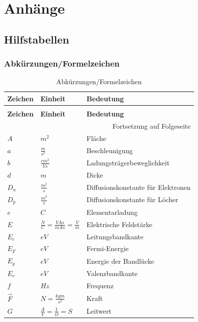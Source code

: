 \documentclass[12pt,a4paper]{report}%
\numberwithin{equation}{section}
\numberwithin{equation}{subsection}
\begin{document}
\chapter{Anhänge}
\section{Hilfstabellen}
	\subsection{Abkürzungen/Formelzeichen} \label{ch:names}
	\renewcommand{\arraystretch}{1.5}
	\begin{longtable} {|p{2cm}|p{3cm}|p{8.4cm}|} \hline
	\textbf{Zeichen} & \textbf{Einheit} & \textbf{Bedeutung} \\
	\hline
	\endfirsthead %
	\caption{Abkürzungen/Formelzeichen}\\ \hline
	\textbf{Zeichen} & \textbf{Einheit} & \textbf{Bedeutung} \\
	\hline
	\endhead %
	\multicolumn{3}{r}{Fortsetzung auf Folgeseite}\\
	\endfoot
	\hline
	\endlastfoot
	
	$A$ & $m^2$ & Fläche \\ \hline
	$a$ & $\frac{m}{s^2}$ & Beschleunigung \\ \hline
	$b$ & $\frac{cm^2}{Vs}$ & Ladungsträgerbeweglichkeit \\ \hline
	$d$ & $m$ & Dicke \\ \hline
	$D_n$ & $\frac{m^2}{s}$ & Diffusionskonstante für Elektronen \\ \hline
	$D_p$ & $\frac{m^2}{s}$ & Diffusionskonstante für Löcher \\ \hline
	$e$ & $C$ & Elementarladung \\ \hline
	$E$ & $\frac{N}{C} = \frac{VAs}{mAs} = \frac{V}{m}$ & Elektrische Feldstärke \\ \hline
	$E_c$ & $eV$ & Leitungsbandkante \\ \hline
	$E_F$ & $eV$ & Fermi-Energie \\ \hline
	$E_g$ & $eV$ & Energie der Bandlücke \\ \hline
	$E_v$ & $eV$ & Valenzbandkante \\ \hline
	$f$ & $Hz$ & Frequenz \\ \hline
	$\vec{F}$ & $N = \frac{kgm}{s^2}$ & Kraft \\ \hline
	$G$ & $\frac{A}{V} = \frac{1}{\Omega} = S$ & Leitwert \\ \hline
	

\end{longtable}
\end{document}
